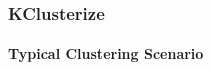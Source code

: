 %	
%	
%	

\begin{frame}
	\frametitle{KClusterize}
	\framesubtitle{Typical Clustering Scenario}
	
	\vspace{0.5cm}
	

\end{frame}
